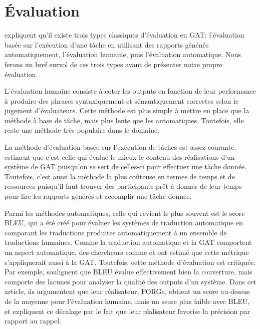 
\chapter{Évaluation}\label{ch:eval}

\cite{ReiterInvestigationValidityMetrics2009} expliquent qu'il existe trois types classiques d'évaluation en \ac{GAT}: l'évaluation basée sur l'exécution d'une tâche en utilisant des rapports génénés automatiquement, l'évaluation humaine, puis l'évaluation automatique. Nous ferons un bref survol de ces trois types avant de présenter notre propre évaluation.

L'évaluation humaine consiste à coter les outputs en fonction de leur performance à produire des phrases syntaxiquement et sémantiquement correctes selon le jugement d'évaluateurs. Cette méthode est plus simple à mettre en place que la méthode à base de tâche, mais plus lente que les automatiques. Toutefois, elle reste une méthode très populaire dans le domaine.

La méthode d'évaluation basée sur l'exécution de tâches est assez courante. \cite{ReiterInvestigationValidityMetrics2009} estiment que c'est celle qui évalue le mieux le contenu des réalisations d'un système de \ac{GAT} puisqu'on se sert de celles-ci pour effectuer une tâche donnée.  Toutefois, c'est aussi la méthode la plus coûteuse en termes de temps et de ressources puisqu'il faut trouver des participants prêt à donner de leur temps pour lire les rapports générés et accomplir une tâche donnée.

Parmi les méthodes automatiques, celle qui revient le plus souvent est le score BLEU, qui a été créé pour évaluer les systèmes de traduction automatique en comparant les traductions produites automatiquement à un ensemble de traductions humaines. Comme la traduction automatique et la \ac{GAT} comportent un aspect automatique, des chercheurs comme \cite{Langkilde-gearyForestbasedstatisticalsentence2000} et \cite{Habash2003MatadorAL} ont estimé que cette métrique s'appliquerait aussi à la \ac{GAT}. Toutefois, cette méthode d'évaluation est critiquée. Par exemple, \cite{DBLP:conf/semeval/MilleCBW17} soulignent que BLEU évalue effectivement bien la couverture, mais comporte des lacunes pour analyser la qualité des outputs d'un système. Dans cet article, ils argumentent que leur réalisateur, FORGe, obtient un score au-dessus de la moyenne pour l'évaluation humaine, mais un score plus faible avec BLEU, et expliquent ce décalage par le fait que leur réalisateur favorise la précision par rapport au rappel.

